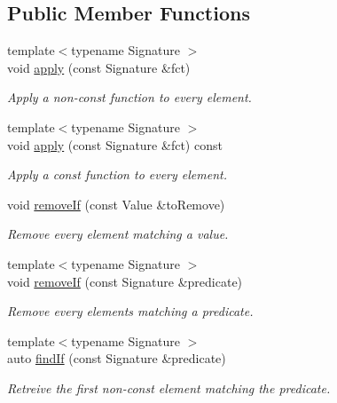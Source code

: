 \subsection*{Public Member Functions}
\begin{DoxyCompactItemize}
\item 
{\footnotesize template$<$typename Signature $>$ }\\void \mbox{\hyperlink{classo_a_1_1_container_helper_ab0a8a0bce2178cf1ded50b3d4202aa39}{apply}} (const Signature \&fct)
\begin{DoxyCompactList}\small\item\em Apply a non-\/const function to every element. \end{DoxyCompactList}\item 
{\footnotesize template$<$typename Signature $>$ }\\void \mbox{\hyperlink{classo_a_1_1_container_helper_a659bf470905acc97ae8badf9e985190b}{apply}} (const Signature \&fct) const
\begin{DoxyCompactList}\small\item\em Apply a const function to every element. \end{DoxyCompactList}\item 
void \mbox{\hyperlink{classo_a_1_1_container_helper_a9ed895ce074880a44d19c0b37da02c83}{remove\+If}} (const Value \&to\+Remove)
\begin{DoxyCompactList}\small\item\em Remove every element matching a value. \end{DoxyCompactList}\item 
{\footnotesize template$<$typename Signature $>$ }\\void \mbox{\hyperlink{classo_a_1_1_container_helper_abeca65c6bc826fe9ad640599a8912dc3}{remove\+If}} (const Signature \&predicate)
\begin{DoxyCompactList}\small\item\em Remove every elements matching a predicate. \end{DoxyCompactList}\item 
{\footnotesize template$<$typename Signature $>$ }\\auto \mbox{\hyperlink{classo_a_1_1_container_helper_af2ed8bdecb2d870ba366ee56d7e6b90a}{find\+If}} (const Signature \&predicate)
\begin{DoxyCompactList}\small\item\em Retreive the first non-\/const element matching the predicate. \end{DoxyCompactList}\item 

\end{DoxyCompactItemize}
